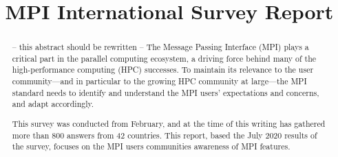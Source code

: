 \documentclass[conference,10pt,letterpaper]{IEEEtran}
\begin{document}
\title{MPI International Survey Report}

\author{
  \and
  \and
  \and
  \and
  \and
  \and
}  

\maketitle

\begin{abstract}
-- this abstract should be rewritten --
%
The Message Passing Interface (MPI) plays a critical part in the
parallel computing ecosystem, a driving force behind many of the
high-performance computing (HPC) successes. To maintain its relevance
to the user community---and in particular to the growing HPC community
at large---the MPI standard needs to identify and understand the MPI
users' expectations and concerns, and adapt accordingly.
%

This survey was conducted from February, and at the time of
this writing has gathered more than 800 answers from 42 countries.
%
This report, based the July 2020 results of the survey,
focuses on the MPI users communities awareness of MPI features.
%
%
\end{abstract}
\end{document}
